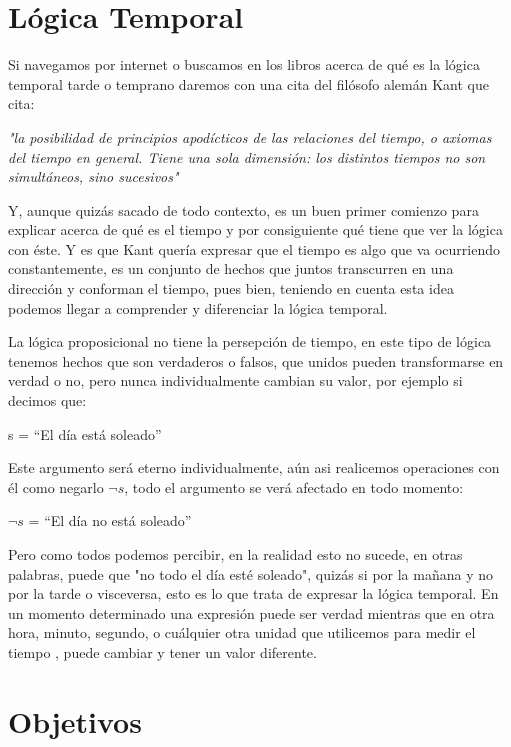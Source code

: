 \section{Lógica Temporal}

Si navegamos por internet o buscamos en los libros acerca de qué es la lógica temporal tarde o temprano daremos con una cita del filósofo alemán Kant que cita: 

\begin{center}
\textit{"la posibilidad de principios apodícticos de las relaciones del tiempo, o axiomas del tiempo en general. Tiene una sola dimensión: los distintos tiempos no son simultáneos, sino sucesivos"}
\end{center}

Y, aunque quizás sacado de todo contexto, es un buen primer comienzo para explicar acerca de qué es el tiempo y por consiguiente qué tiene que ver la lógica con éste. Y es que Kant quería expresar que el tiempo es algo que va ocurriendo constantemente, es un conjunto de hechos que juntos transcurren en una dirección y conforman el tiempo, pues bien, teniendo en cuenta esta idea podemos llegar a comprender y diferenciar la lógica temporal. 

La lógica proposicional no tiene la persepción de tiempo, en este tipo de lógica tenemos hechos que son verdaderos o falsos, que unidos pueden transformarse en verdad o no, pero nunca individualmente cambian su valor, por ejemplo si decimos que:

\begin{center}
s = ``El día está soleado''
\end{center}

Este argumento será eterno individualmente, aún asi realicemos operaciones con él como negarlo $\neg{s}$, todo el argumento se verá afectado en todo momento:

\begin{center}
$\neg{s}$ = ``El día no está soleado''
\end{center}

Pero como todos podemos percibir, en la realidad esto no sucede, en otras palabras, puede que "no todo el día esté soleado", quizás si por la mañana y no por la tarde o visceversa, esto es lo que trata de expresar la lógica temporal. En un momento determinado una expresión puede ser verdad mientras que en otra hora, minuto, segundo, o cuálquier otra unidad que utilicemos para medir el tiempo , puede cambiar y tener un valor diferente. 

\section{Objetivos}

